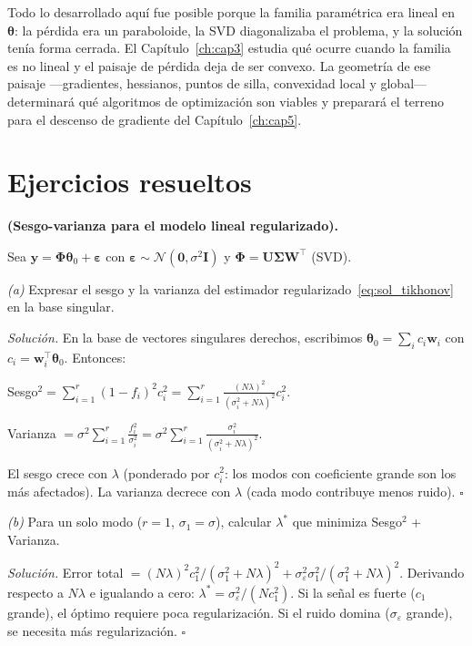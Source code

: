 Todo lo desarrollado aquí fue posible porque la familia paramétrica era
lineal en $\bm{\theta}$: la pérdida era un paraboloide, la SVD
diagonalizaba el problema, y la solución tenía forma cerrada. El
Capítulo~\ref{ch:cap3} estudia qué ocurre cuando la familia es no
lineal y el paisaje de pérdida deja de ser convexo. La geometría de
ese paisaje —gradientes, hessianos, puntos de silla, convexidad local
y global— determinará qué algoritmos de optimización son viables y
preparará el terreno para el descenso de gradiente del
Capítulo~\ref{ch:cap5}.

\section*{Ejercicios resueltos}

\begin{ejercicio}
\label{ej:biasvar_lineal}
\textbf{(Sesgo-varianza para el modelo lineal regularizado).}

Sea $\bm{y} = \bm{\Phi}\bm{\theta}_0 + \bm{\varepsilon}$ con
$\bm{\varepsilon} \sim \mathcal{N}(\bm{0}, \sigma^2\bm{I})$ y
$\bm{\Phi} = \bm{U}\bm{\Sigma}\bm{W}^\top$ (SVD).

\medskip\noindent\textit{(a)} Expresar el sesgo y la varianza del
estimador regularizado~\eqref{eq:sol_tikhonov} en la base singular.

\medskip\noindent\textit{Solución.}
En la base de vectores singulares derechos, escribimos
$\bm{\theta}_0 = \sum_i c_i \bm{w}_i$ con $c_i =
\bm{w}_i^\top\bm{\theta}_0$. Entonces:

Sesgo$^2 = \sum_{i=1}^r (1-f_i)^2 c_i^2
= \sum_{i=1}^r \frac{(N\lambda)^2}{(\sigma_i^2+N\lambda)^2} c_i^2$.

Varianza $= \sigma^2 \sum_{i=1}^r \frac{f_i^2}{\sigma_i^2}
= \sigma^2 \sum_{i=1}^r
\frac{\sigma_i^2}{(\sigma_i^2+N\lambda)^2}$.

El sesgo crece con $\lambda$ (ponderado por $c_i^2$: los modos con
coeficiente grande son los más afectados). La varianza decrece con
$\lambda$ (cada modo contribuye menos ruido). $\square$

\medskip\noindent\textit{(b)} Para un solo modo ($r = 1$, $\sigma_1
= \sigma$), calcular $\lambda^*$ que minimiza
Sesgo$^2$ + Varianza.

\medskip\noindent\textit{Solución.}
Error total $= (N\lambda)^2 c_1^2/(\sigma_1^2+N\lambda)^2 +
\sigma_\varepsilon^2 \sigma_1^2/(\sigma_1^2+N\lambda)^2$.
Derivando respecto a $N\lambda$ e igualando a cero:
$\lambda^* = \sigma_\varepsilon^2/(Nc_1^2)$. Si la señal es fuerte
($c_1$ grande), el óptimo requiere poca regularización. Si el ruido
domina ($\sigma_\varepsilon$ grande), se necesita más regularización.
$\square$
\end{ejercicio}

